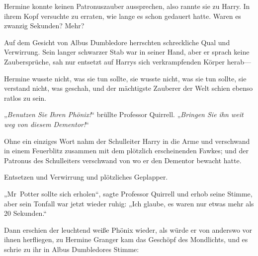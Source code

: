 Hermine konnte keinen Patronuszauber aussprechen, also rannte sie zu Harry. In ihrem Kopf versuchte zu erraten, wie lange es schon gedauert hatte. Waren es zwanzig Sekunden? Mehr?

Auf dem Gesicht von Albus Dumbledore herrschten schreckliche Qual und Verwirrung. Sein langer schwarzer Stab war in seiner Hand, aber er sprach keine Zaubersprüche, sah nur entsetzt auf Harrys sich verkrampfenden Körper herab—

Hermine wusste nicht, was sie tun sollte, sie wusste nicht, was sie tun sollte, sie verstand nicht, was geschah, und der mächtigste Zauberer der Welt schien ebenso ratlos zu sein.

„\emph{Benutzen Sie Ihren Phönix!}“ brüllte Professor Quirrell. „\emph{Bringen Sie ihn weit weg von diesem Dementor!}“

Ohne ein einziges Wort nahm der Schulleiter Harry in die Arme und verschwand in einem Feuerblitz zusammen mit dem plötzlich erscheinenden Fawkes; und der Patronus des Schulleiters verschwand von wo er den Dementor bewacht hatte.

Entsetzen und Verwirrung und plötzliches Geplapper.

„Mr~Potter sollte sich erholen“, sagte Professor Quirrell und erhob seine Stimme, aber sein Tonfall war jetzt wieder ruhig: „Ich glaube, es waren nur etwas mehr als 20 Sekunden.“

Dann erschien der leuchtend weiße Phönix wieder, als würde er von anderswo vor ihnen herfliegen, zu Hermine Granger kam das Geschöpf des Mondlichts, und es schrie zu ihr in Albus Dumbledores Stimme:

